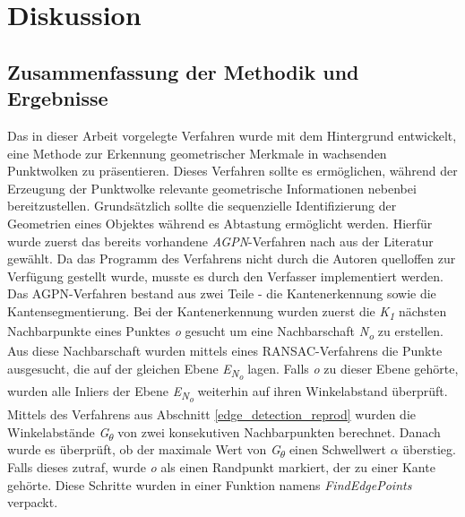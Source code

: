 
\chapter{Diskussion}
\section{Zusammenfassung der Methodik und Ergebnisse}
Das in dieser Arbeit vorgelegte Verfahren wurde mit dem Hintergrund entwickelt, eine Methode zur Erkennung geometrischer Merkmale in wachsenden Punktwolken zu präsentieren. Dieses Verfahren sollte es ermöglichen, während der Erzeugung der Punktwolke relevante geometrische Informationen nebenbei bereitzustellen. Grundsätzlich sollte die sequenzielle Identifizierung der Geometrien eines Objektes während es Abtastung ermöglicht werden. Hierfür wurde zuerst das bereits vorhandene \textit{AGPN}-Verfahren nach \autocite{ni_edge_2016} aus der Literatur gewählt. Da das Programm des Verfahrens nicht durch die Autoren quelloffen zur Verfügung gestellt wurde, musste es durch den Verfasser implementiert werden. Das AGPN-Verfahren bestand aus zwei Teile - die Kantenerkennung sowie die Kantensegmentierung. Bei der Kantenerkennung wurden zuerst die \textit{K\textsubscript{1}} nächsten Nachbarpunkte eines Punktes \textit{o} gesucht um eine Nachbarschaft \textit{N\textsubscript{o}} zu erstellen. Aus diese Nachbarschaft wurden mittels eines RANSAC-Verfahrens die Punkte ausgesucht, die auf der gleichen Ebene \textit{E\textsubscript{N\textsubscript{o}}} lagen. Falls \textit{o} zu dieser Ebene gehörte, wurden alle Inliers der Ebene \textit{E\textsubscript{N\textsubscript{o}}} weiterhin auf ihren Winkelabstand überprüft. Mittels des Verfahrens aus Abschnitt \ref{edge_detection_reprod} wurden die Winkelabstände \textit{G\textsubscript{$\theta$}} von zwei konsekutiven Nachbarpunkten berechnet. Danach wurde es überprüft, ob der maximale Wert von \textit{G\textsubscript{$\theta$}} einen Schwellwert \textit{$\alpha$} überstieg. Falls dieses zutraf, wurde \textit{o} als einen Randpunkt markiert, der zu einer Kante gehörte. Diese Schritte wurden in einer Funktion namens \textit{FindEdgePoints} verpackt. 

